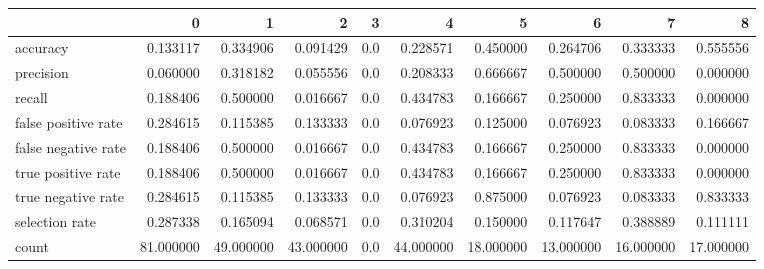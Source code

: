 \begin{tabular}{lrrrrrrrrr}
\toprule
{} &          0 &          1 &          2 &    3 &          4 &          5 &          6 &          7 &          8 \\
\midrule
accuracy            &   0.133117 &   0.334906 &   0.091429 &  0.0 &   0.228571 &   0.450000 &   0.264706 &   0.333333 &   0.555556 \\
precision           &   0.060000 &   0.318182 &   0.055556 &  0.0 &   0.208333 &   0.666667 &   0.500000 &   0.500000 &   0.000000 \\
recall              &   0.188406 &   0.500000 &   0.016667 &  0.0 &   0.434783 &   0.166667 &   0.250000 &   0.833333 &   0.000000 \\
false positive rate &   0.284615 &   0.115385 &   0.133333 &  0.0 &   0.076923 &   0.125000 &   0.076923 &   0.083333 &   0.166667 \\
false negative rate &   0.188406 &   0.500000 &   0.016667 &  0.0 &   0.434783 &   0.166667 &   0.250000 &   0.833333 &   0.000000 \\
true positive rate  &   0.188406 &   0.500000 &   0.016667 &  0.0 &   0.434783 &   0.166667 &   0.250000 &   0.833333 &   0.000000 \\
true negative rate  &   0.284615 &   0.115385 &   0.133333 &  0.0 &   0.076923 &   0.875000 &   0.076923 &   0.083333 &   0.833333 \\
selection rate      &   0.287338 &   0.165094 &   0.068571 &  0.0 &   0.310204 &   0.150000 &   0.117647 &   0.388889 &   0.111111 \\
count               &  81.000000 &  49.000000 &  43.000000 &  0.0 &  44.000000 &  18.000000 &  13.000000 &  16.000000 &  17.000000 \\
\bottomrule
\end{tabular}
